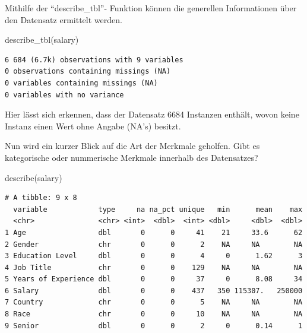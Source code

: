 \documentclass[
  letterpaper,
  DIV=11,
  numbers=noendperiod]{scrartcl}
\newenvironment{Shaded}{\begin{snugshade}}{\end{snugshade}}
\newcommand{\FunctionTok}[1]{\textcolor[rgb]{0.28,0.35,0.67}{#1}}
\newcommand{\NormalTok}[1]{\textcolor[rgb]{0.00,0.23,0.31}{#1}}
\begin{document}
Mithilfe der ``describe\_tbl''- Funktion können die generellen
Informationen über den Datensatz ermittelt werden.

\begin{Shaded}
\begin{Highlighting}[]
\FunctionTok{describe\_tbl}\NormalTok{(salary)}
\end{Highlighting}
\end{Shaded}

\begin{verbatim}
6 684 (6.7k) observations with 9 variables
0 observations containing missings (NA)
0 variables containing missings (NA)
0 variables with no variance
\end{verbatim}

Hier lässt sich erkennen, dass der Datensatz 6684 Instanzen enthält,
wovon keine Instanz einen Wert ohne Angabe (NA's) besitzt.

Nun wird ein kurzer Blick auf die Art der Merkmale geholfen. Gibt es
kategorische oder nummerische Merkmale innerhalb des Datensatzes?

\begin{Shaded}
\begin{Highlighting}[]
\FunctionTok{describe}\NormalTok{(salary)}
\end{Highlighting}
\end{Shaded}

\begin{verbatim}
# A tibble: 9 x 8
  variable            type     na na_pct unique   min      mean    max
  <chr>               <chr> <int>  <dbl>  <int> <dbl>     <dbl>  <dbl>
1 Age                 dbl       0      0     41    21     33.6      62
2 Gender              chr       0      0      2    NA     NA        NA
3 Education Level     dbl       0      0      4     0      1.62      3
4 Job Title           chr       0      0    129    NA     NA        NA
5 Years of Experience dbl       0      0     37     0      8.08     34
6 Salary              dbl       0      0    437   350 115307.   250000
7 Country             chr       0      0      5    NA     NA        NA
8 Race                chr       0      0     10    NA     NA        NA
9 Senior              dbl       0      0      2     0      0.14      1
\end{verbatim}
\end{document}
